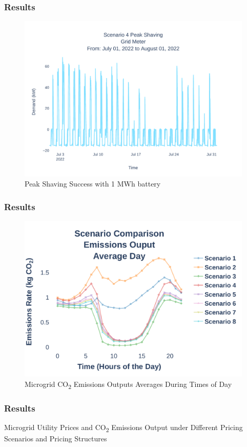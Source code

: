 \documentclass[aspectratio=169, 8 pt]{beamer}
\begin{document}
		\begin{frame}
			\frametitle{Results}
			\begin{figure}
				\centering
				\includegraphics[width=0.7\linewidth]{Fig/scenario_4_peak_shaving}
				\caption{Peak Shaving Success with 1 MWh battery}
				\label{fig:scenario4peakshaving}
			\end{figure}
			
		\end{frame}
	
		\begin{frame}
			\frametitle{Results}
			\begin{figure}
				\centering
				\includegraphics[width=0.7\linewidth]{Fig/emissions_scenario_comparison_run_3_large_font}
				\caption{Microgrid  CO\textsubscript{2} Emissions Outputs Averages During Times of Day}
				\label{fig:emissionsscenariocomparison}
			\end{figure}
		\end{frame}
	
		\begin{frame}
			\frametitle{Results}
			\begin{table}
				\caption{Microgrid Utility Prices and CO\textsubscript{2} Emissions Output under Different Pricing Scenarios and Pricing Structures}
				\centering
				
				\label{tab:emissions}
			\end{table}
		\end{frame}
	
\end{document}
